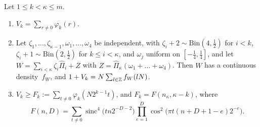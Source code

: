 \begin{proposition}\label{prop:S-fourier}
Let $1\le k<\kappa\le m$.
\begin{enumerate}[label=(\alph*)]
\item $V_k=\sum_{r\ne0}\varphi_k(r)$.
\item Let $\zeta_1,\dots,\zeta_{\kappa-1},\omega_1,\dots,\omega_4$ be independent, with $\zeta_i+2\sim\mathrm{Bin}(4,\frac12)$
  for $i<k$, $\zeta_i+1\sim\mathrm{Bin}(2,\frac12)$ for $k\le i<\kappa$, and $\omega_j$ uniform on $[-\frac14,\frac14]$, and
  let $W=\sum_{i<\kappa}\zeta_i\hat\Pi_i+Z$ with $Z=\hat\Pi_\kappa(\omega_1+\dots+\omega_4)$. Then $W$ has a continuous
  density~$f_W$, and $1+V_k=N\sum_{l\in\mathbb{Z}}f_W(lN)$.
\item $V_k\ge F_k:=\sum_{t\ne0}\varphi_k(N2^{k-1}t)$, and $F_k=F(n_\kappa,\kappa-k)$, where
  \[
    F(n,D)=\sum_{t\ne0}\operatorname{sinc}^4\bigl(tn2^{-D-2}\bigr)\prod_{e=1}^{D}\cos^2\bigl(\pi t(n+D+1-e)2^{-e}\bigr).
  \]
\end{enumerate}
\end{proposition}

